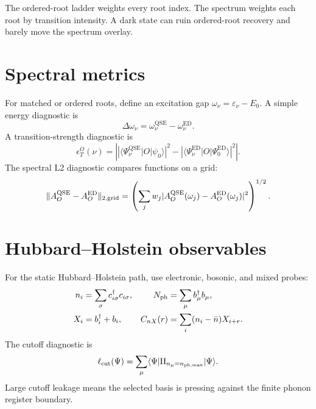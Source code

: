 \documentclass[10pt,twocolumn]{article}
\newcommand{\qse}{\mathrm{QSE}}
\newcommand{\ED}{\mathrm{ED}}
\newcommand{\ket}[1]{\lvert #1\rangle}
\newcommand{\bra}[1]{\langle #1\rvert}
\newcommand{\phmax}{n_{\mathrm{ph,max}}}
\begin{document}
\begin{intuitionbox}
The ordered-root ladder weights every root index. The spectrum weights each root by transition intensity. A dark state can ruin ordered-root recovery and barely move the spectrum overlay.
\end{intuitionbox}

\section{Spectral metrics}

For matched or ordered roots, define an excitation gap \(\omega_\nu=\varepsilon_\nu-E_0\). A simple energy diagnostic is
\begin{equation}
\Delta\omega_\nu=\omega_\nu^{\qse}-\omega_\nu^{\ED}.
\label{eq:gap_error}
\end{equation}
A transition-strength diagnostic is
\begin{equation}
\epsilon_T^O(\nu)=
\left||\bra{\Psi_\nu^{\qse}}O\ket{\psi_0}|^2
-|\bra{\Psi_\nu^{\ED}}O\ket{\Psi_0^{\ED}}|^2\right|.
\label{eq:T_error}
\end{equation}
The spectral L2 diagnostic compares functions on a grid:
\begin{equation}
\|A_O^{\qse}-A_O^{\ED}\|_{2,\rm grid}
=\left(\sum_j w_j|A_O^{\qse}(\omega_j)-A_O^{\ED}(\omega_j)|^2\right)^{1/2}.
\label{eq:spectral_l2}
\end{equation}

\section{Hubbard--Holstein observables}

For the static Hubbard--Holstein path, use electronic, bosonic, and mixed probes:
\begin{equation}
\begin{aligned}
n_i&=\sum_\sigma c_{i\sigma}^\dagger c_{i\sigma},
&N_{\rm ph}&=\sum_\mu b_\mu^\dagger b_\mu,\\
X_i&=b_i^\dagger+b_i,
&C_{nX}(r)&=\sum_i(n_i-\bar n)X_{i+r}.
\end{aligned}
\label{eq:hh_obs}
\end{equation}
The cutoff diagnostic is
\begin{equation}
\ell_{\rm cut}(\Psi)=\sum_\mu\bra{\Psi}\Pi_{n_\mu=\phmax}\ket{\Psi}.
\label{eq:cutoff}
\end{equation}
Large cutoff leakage means the selected basis is pressing against the finite phonon register boundary.
\end{document}
